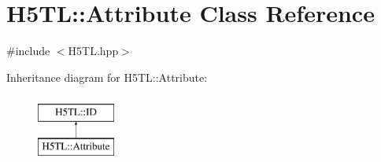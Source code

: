 \hypertarget{class_h5_t_l_1_1_attribute}{\section{H5\-T\-L\-:\-:Attribute Class Reference}
\label{class_h5_t_l_1_1_attribute}
}


{\ttfamily \#include $<$H5\-T\-L.\-hpp$>$}

Inheritance diagram for H5\-T\-L\-:\-:Attribute\-:\begin{figure}[H]
\begin{center}
\leavevmode
\includegraphics[height=2.000000cm]{class_h5_t_l_1_1_attribute}
\end{center}
\end{figure}
